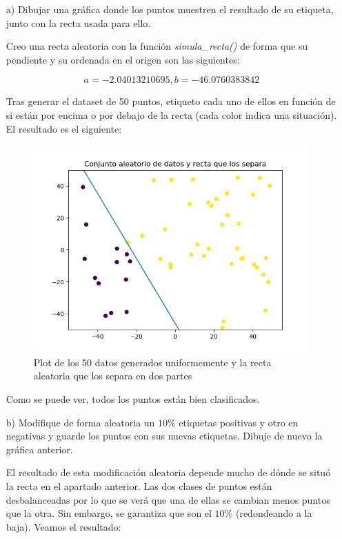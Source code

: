 \begin{itemize}
	\item[a)] Dibujar una gráfica donde los puntos muestren el resultado de su etiqueta, junto con la recta usada para ello.
	
	Creo una recta aleatoria con la función \textit{simula\_recta()} de forma que su pendiente y su ordenada en el origen son las siguientes:
	
	$$a = -2.04013210695, b=-46.0760383842$$
	
	Tras generar el dataset de 50 puntos, etiqueto cada uno de ellos en función de si están por encima o por debajo de la recta (cada color indica una situación). El resultado es el siguiente: 
	
	\begin{figure}[H] %
		\centering
		\includegraphics[scale=0.5]{recta1.png}  %
		\caption{Plot de los 50 datos generados uniformemente y la recta aleatoria que los separa en dos partes} 
		\label{fig:recta1}
	\end{figure}

Como se puede ver, todos los puntos están bien clasificados.

	\item[b)] Modifique de forma aleatoria un $10\%$ etiquetas positivas y otro en negativas y guarde los puntos con sus nuevas etiquetas. Dibuje de nuevo la gráfica anterior.
	
	El resultado de esta modificación aleatoria depende mucho de dónde se situó la recta en el apartado anterior. Las dos clases de puntos están desbalanceadas por lo que se verá que una de ellas se cambian menos puntos que la otra. Sin embargo, se garantiza que son el $10\%$ (redondeando a la baja). Veamos el resultado:
	

\end{itemize}
